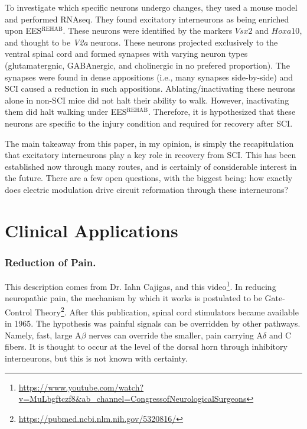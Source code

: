 To investigate which specific neurons undergo changes, they used a mouse model and performed RNAseq. They found excitatory interneurons as being enriched upon EES$^{\mathrm{REHAB}}$. These neurons were identified by the markers $Vsx2$ and $Hoxa10$, and thought to be \textit{V2a} neurons. These neurons projected exclusively to the ventral spinal cord and formed synapses with varying neuron types (glutamatergnic, GABAnergic, and cholinergic in no prefered proportion). The synapses were found in dense appositions (i.e., many synapses side-by-side) and SCI caused a reduction in such appositions. Ablating/inactivating these neurons alone in non-SCI mice did not halt their ability to walk. However, inactivating them did halt walking under EES$^{\mathrm{REHAB}}$. Therefore, it is hypothesized that these neurons are specific to the injury condition and required for recovery after SCI.\newline

The main takeaway from this paper, in my opinion, is simply the recapitulation that excitatory interneurons play a key role in recovery from SCI. This has been established now through many routes, and is certainly of considerable interest in the future. There are a few open questions, with the biggest being: how exactly does electric modulation drive circuit reformation through these interneurons? 

\section{Clinical Applications}

\subsubsection{Reduction of Pain.}
This description comes from Dr. Iahn Cajigas, and this video\footnote{\url{https://www.youtube.com/watch?v=MuLbgftczf8\&ab_channel=CongressofNeurologicalSurgeons}}. In reducing neuropathic pain, the mechanism by which it works is postulated to be Gate-Control Theory\footnote{\url{https://pubmed.ncbi.nlm.nih.gov/5320816/}}. After this publication, spinal cord stimulators became available in 1965. The hypothesis was painful signals can be overridden by other pathways. Namely, fast, large A$\beta$ nerves can override the smaller, pain carrying A$\delta$ and C fibers. It is thought to occur at the level of the dorsal horn through inhibitory interneurons, but this is not known with certainty.\newline

